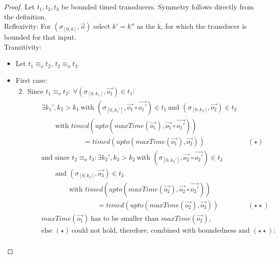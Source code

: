 \begin{proof}
  Let \(t_1, t_2, t_3\) be bounded timed transducers.
  Symmetry follows directly from the definition.\\
  Reflexivity: For \((\sigma_{[0,k]}, \vec{o})\) select \(k' = k''\) as the k, for which the transducer is bounded for that input.\\
  Transitivity:
  \begin{itemize}
    \item Let \(t_1 \equiv_o t_2\), \(t_2 \equiv_o t_3\).
    \item First case:
      \begin{alignat*}{2}
        &\text{Since } t_1 \equiv_o t_2:\ \forall (\sigma_{[0,k_1]}, \vec{o_1}) \in t_1: \\
        &\hspace{2em} \exists k_1', k_2 > k_1\ \text{with } (\sigma_{[0,k_1']}, \vec{o_1}\circ\vec{o_1'}) \in t_1\ \text{and } (\sigma_{[0,k_2]}, \vec{o_2}) \in t_2 \\
        &\hspace{4em} \text{with } \mathit{timed}(\mathit{upto}(\mathit{maxTime}(\vec{o_1}),\vec{o_1} \circ \vec{o_1'} )) \\
        &\hspace{8em} = \mathit{timed}(\mathit{upto}(\mathit{maxTime}(\vec{o_1}),\vec{o_2})) && (\star)\\
        &\hspace{2em} \text{and since } t_2 \equiv_o t_3: \exists k_2', k_3 > k_2\ \text{with } (\sigma_{[0,k_2']}, \vec{o_2}\circ\vec{o_2'}) \in t_2 \\
        &\hspace{4em} \text{and } (\sigma_{[0,k_3]}, \vec{o_3}) \in t_3 \\
        &\hspace{6em} \text{with } \mathit{timed}(\mathit{upto}(\mathit{maxTime}(\vec{o_2}),\vec{o_2} \circ \vec{o_2'} )) \\
        &\hspace{10em} = \mathit{timed}(\mathit{upto}(\mathit{maxTime}(\vec{o_2}),\vec{o_3})) && (\star\star)\\
        &\hspace{2em} \mathit{maxTime}(\vec{o_1})\ \text{has to be smaller than }\mathit{maxTime}(\vec{o_2}), \\
        &\hspace{2em} \text{else } (\star)\ \text{could not hold, therefore, combined with boundedness and }(\star\star): \\

\end{alignat*}
\end{itemize}
\end{proof}

